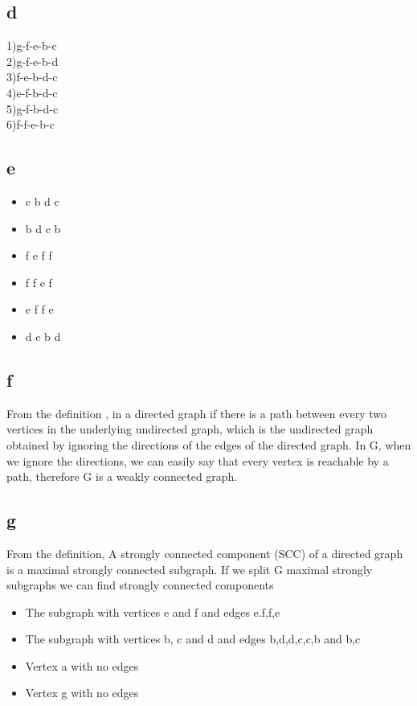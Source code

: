 \documentclass[11pt]{article}
\begin{document}
\subsection*{d}
1)g-f-e-b-c \\
2)g-f-e-b-d \\
3)f-e-b-d-c \\
4)e-f-b-d-c \\
5)g-f-b-d-c \\
6)f-f-e-b-c 
\subsection*{e}
\begin{itemize}
\item c b d c
\item b d c b
\item f e f f
\item f f e f
\item e f f e
\item d c b d
\end{itemize}
\subsection*{f}
From the definition , in a directed graph if there is a path between every two vertices in the underlying undirected graph, which is the undirected graph obtained by ignoring the directions of the edges of the directed graph. In G, when we ignore the directions, we can easily say that every vertex is reachable by a path, therefore G is a weakly connected graph.
\subsection*{g}
From the definition, A strongly connected component (SCC) of a directed graph is a maximal strongly connected subgraph. If we split G maximal strongly subgraphs we can find strongly connected components
\begin{itemize}
\item The subgraph with vertices e and f and edges {e.f},{f,e}
\item The subgraph with vertices b, c and d and edges {b,d},{d,c},{c,b} and {b,c}
\item Vertex a with no edges
\item Vertex g with no edges
\end{itemize}
\end{document}

